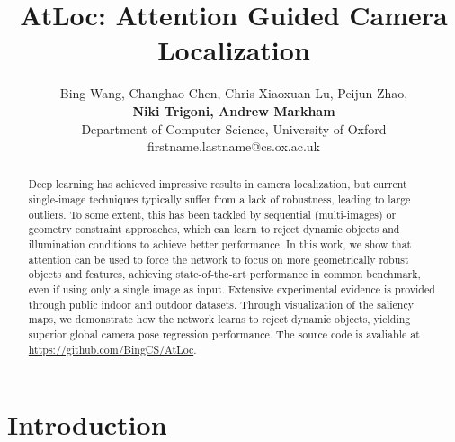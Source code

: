 \documentclass[letterpaper]{article}
\newcommand{\andrew}[1]{}
\begin{document}
\title{AtLoc: Attention Guided Camera Localization}

\author{Bing Wang,
Changhao Chen,
Chris Xiaoxuan Lu,
Peijun Zhao,
\\
\Large{\textbf{Niki Trigoni,
Andrew Markham
}}
\\
{Department of Computer Science, University of Oxford}\\
firstname.lastname@cs.ox.ac.uk
}

\maketitle
\begin{abstract}
Deep learning has achieved impressive results in camera localization, but current single-image techniques typically suffer from a lack of robustness, leading to large outliers. To some extent, this has been tackled by sequential (multi-images) or geometry constraint approaches, which can learn to reject dynamic objects and illumination conditions to achieve better performance. In this work, we show that attention can be used to force the network to focus on more geometrically robust objects and features, achieving state-of-the-art performance in common benchmark, even if using only a single image as input. Extensive experimental evidence is provided through public indoor and outdoor datasets. Through visualization of the saliency maps, we demonstrate how the network learns to reject dynamic objects, yielding superior global camera pose regression performance. The source code is avaliable at \url{https://github.com/BingCS/AtLoc}.
\end{abstract}
\section{Introduction}
\andrew{high level comments: It is clear that this technique works better than SOTA, even better than sequential, which is in itself quite amazing. But I don't see any deep insight into either why it works better or why it is not a trivial addition (i.e. just add attention to any network and it inevitably gets better). I unfortunately don't have a good suggestion on how to make this clearer. Intuitively, relocalization fails when images which are spatially far from one another have similar features in the embedding space. Can you demonstrate or show that attention makes images "cluster" better that are spatially similar? Perhaps an information theoretic metric, or t-SNE embedding, or some insight into the manifold would help understand why attention is better at "hashing" distant images to different embeddings}
\end{document}

